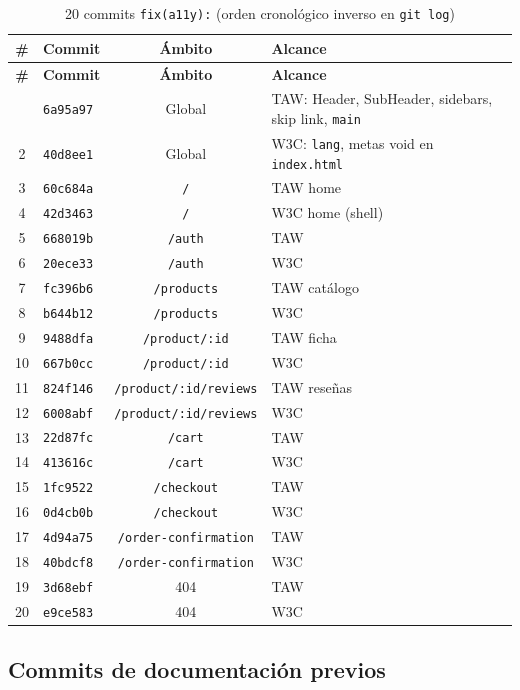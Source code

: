 \documentclass[11pt,a4paper]{article}
\begin{document}
{\footnotesize
\begin{longtable}{@{}clcl@{}}
\caption{20 commits \texttt{fix(a11y):} (orden cronológico inverso en \texttt{git log})} \\
\toprule
\textbf{\#} & \textbf{Commit} & \textbf{Ámbito} & \textbf{Alcance} \\
\midrule
\endfirsthead
\toprule
\textbf{\#} & \textbf{Commit} & \textbf{Ámbito} & \textbf{Alcance} \\
\midrule
\endhead
\bottomrule
\endfoot
1 & \texttt{6a95a97} & Global & TAW: Header, SubHeader, sidebars, skip link, \texttt{main} \\
2 & \texttt{40d8ee1} & Global & W3C: \texttt{lang}, metas void en \texttt{index.html} \\
3 & \texttt{60c684a} & \texttt{/} & TAW home \\
4 & \texttt{42d3463} & \texttt{/} & W3C home (shell) \\
5 & \texttt{668019b} & \texttt{/auth} & TAW \\
6 & \texttt{20ece33} & \texttt{/auth} & W3C \\
7 & \texttt{fc396b6} & \texttt{/products} & TAW catálogo \\
8 & \texttt{b644b12} & \texttt{/products} & W3C \\
9 & \texttt{9488dfa} & \texttt{/product/:id} & TAW ficha \\
10 & \texttt{667b0cc} & \texttt{/product/:id} & W3C \\
11 & \texttt{824f146} & \texttt{/product/:id/reviews} & TAW reseñas \\
12 & \texttt{6008abf} & \texttt{/product/:id/reviews} & W3C \\
13 & \texttt{22d87fc} & \texttt{/cart} & TAW \\
14 & \texttt{413616c} & \texttt{/cart} & W3C \\
15 & \texttt{1fc9522} & \texttt{/checkout} & TAW \\
16 & \texttt{0d4cb0b} & \texttt{/checkout} & W3C \\
17 & \texttt{4d94a75} & \texttt{/order-confirmation} & TAW \\
18 & \texttt{40bdcf8} & \texttt{/order-confirmation} & W3C \\
19 & \texttt{3d68ebf} & 404 & TAW \\
20 & \texttt{e9ce583} & 404 & W3C \\
\bottomrule
\end{longtable}
}

\subsection{Commits de documentación previos}
\end{document}
